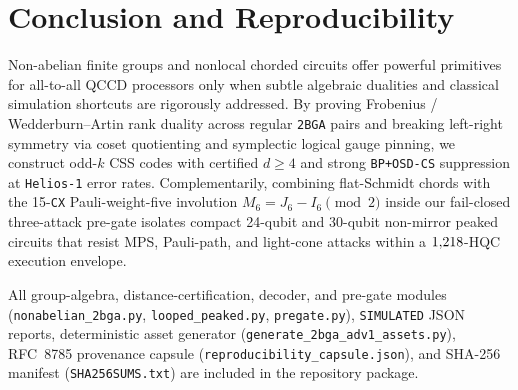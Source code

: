 \documentclass[aps,prapplied,reprint,longbibliography]{revtex4-2}
\begin{document}
\section{Conclusion and Reproducibility}
\label{sec:conclusion}

Non-abelian finite groups and nonlocal chorded circuits offer powerful primitives for all-to-all QCCD processors only when subtle algebraic dualities and classical simulation shortcuts are rigorously addressed. By proving Frobenius / Wedderburn--Artin rank duality across \TwoBgaPairsChecked{} regular \texttt{2BGA} pairs and breaking left-right symmetry via coset quotienting and symplectic logical gauge pinning, we construct \TwoBgaOddKCount{} odd-$k$ CSS codes with certified $d \ge 4$ and strong \texttt{BP+OSD-CS} suppression at \texttt{Helios-1} error rates. Complementarily, combining flat-Schmidt chords with the 15-\texttt{CX} Pauli-weight-five involution $M_6 = J_6 - I_6 \pmod 2$ inside our fail-closed three-attack pre-gate isolates compact 24-qubit and 30-qubit non-mirror peaked circuits that resist MPS, Pauli-path, and light-cone attacks within a $1{,}218{}$-HQC execution envelope.

All group-algebra, distance-certification, decoder, and pre-gate modules (\texttt{nonabelian\_2bga.py}, \texttt{looped\_peaked.py}, \texttt{pregate.py}), \texttt{SIMULATED} JSON reports, deterministic asset generator (\texttt{generate\_2bga\_adv1\_assets.py}), RFC~8785 provenance capsule (\texttt{reproducibility\_capsule.json}), and SHA-256 manifest (\texttt{SHA256SUMS.txt}) are included in the repository package.
\end{document}
